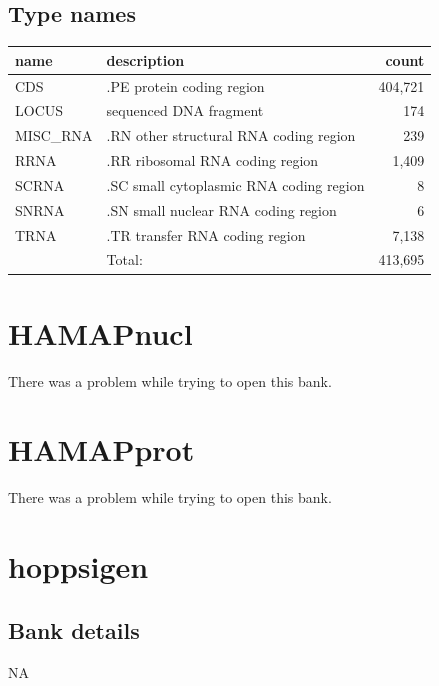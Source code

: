 \documentclass{article}
\begin{document}
\begin{Schunk}
\subsection{Type names}
\noindent\begin{tabular}{llr}
\hline \hline
name & description & count \\
\hline
CDS  &  .PE protein coding region  &  404,721 \\
LOCUS  &  sequenced DNA fragment  &  174 \\
MISC\_RNA  &  .RN other structural RNA coding region  &  239 \\
RRNA  &  .RR ribosomal RNA coding region  &  1,409 \\
SCRNA  &  .SC small cytoplasmic RNA coding region  &  8 \\
SNRNA  &  .SN small nuclear RNA coding region  &  6 \\
TRNA  &  .TR transfer RNA coding region  &  7,138 \\
\hline
 & Total: & 413,695 \\
\hline \hline
\end{tabular}

\section{ HAMAPnucl }
There was a problem while trying to open this bank.
\section{ HAMAPprot }
There was a problem while trying to open this bank.
\section{ hoppsigen }
\subsection{Bank details}
NA


\end{Schunk}
\end{document}
